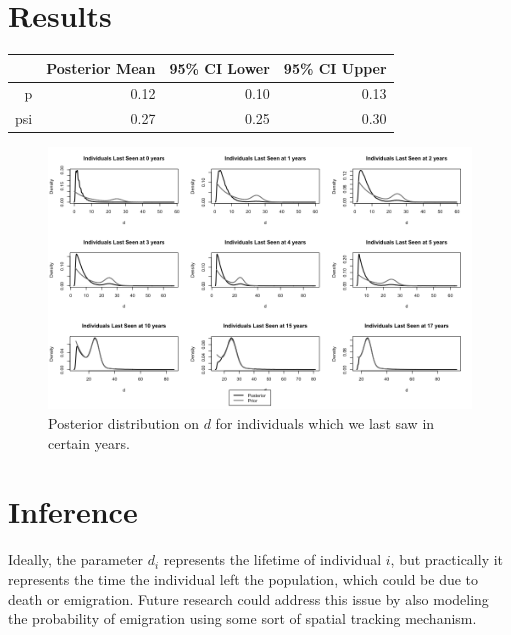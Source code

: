 \documentclass[12pt, a4paper]{article}
\begin{document}
\section{Results}

\begin{table}[ht]
\centering
\begin{tabular}{rrrr}
  \hline
   & Posterior Mean & 95\% CI Lower & 95\% CI Upper \\ 
  \hline
  p & 0.12 & 0.10 & 0.13 \\ 
  psi & 0.27 & 0.25 & 0.30 \\ 
   \hline
\end{tabular}
\end{table}

\begin{figure}
\centering
\includegraphics[width = \textwidth]{Posterior.d.png}
\caption{Posterior distribution on $d$ for individuals which we last saw in certain years.}
\end{figure}

\section{Inference}

Ideally, the parameter $d_i$ represents the lifetime of individual $i$, but practically it represents the time the individual left the population, which could be due to death or emigration. Future research could address this issue by also modeling the probability of emigration using some sort of spatial tracking mechanism. 
\end{document}
